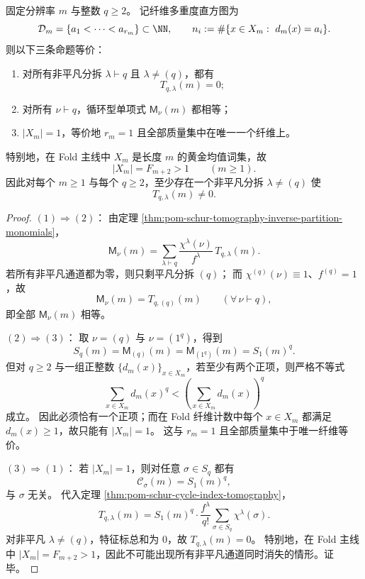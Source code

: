 \begin{theorem}\label{thm:pom-nontrivial-schur-vanishing-iff-single-fiber}
固定分辨率 \(m\) 与整数 \(q\ge 2\)。
记纤维多重度直方图为
\[
\mathcal D_m=\{a_1<\cdots<a_{r_m}\}\subset\NN,
\qquad
n_i:=\#\{x\in X_m:\ d_m(x)=a_i\}.
\]
则以下三条命题等价：
\begin{enumerate}
  \item 对所有非平凡分拆 \(\lambda\vdash q\) 且 \(\lambda\neq(q)\)，都有
  \[
  T_{q,\lambda}(m)=0;
  \]
  \item 对所有 \(\nu\vdash q\)，循环型单项式 \(\mathsf{M}_\nu(m)\) 都相等；
  \item \(|X_m|=1\)，等价地 \(r_m=1\) 且全部质量集中在唯一一个纤维上。
\end{enumerate}
特别地，在 Fold 主线中 \(X_m\) 是长度 \(m\) 的黄金均值词集，故
\[
|X_m|=F_{m+2}>1\qquad(m\ge 1).
\]
因此对每个 \(m\ge 1\) 与每个 \(q\ge 2\)，至少存在一个非平凡分拆 \(\lambda\neq(q)\) 使
\[
T_{q,\lambda}(m)\neq 0.
\]
\end{theorem}
\begin{proof}
\((1)\Rightarrow(2)\)：
由定理 \ref{thm:pom-schur-tomography-inverse-partition-monomials}，
\[
\mathsf{M}_\nu(m)=\sum_{\lambda\vdash q}\frac{\chi^\lambda(\nu)}{f^\lambda}\,T_{q,\lambda}(m).
\]
若所有非平凡通道都为零，则只剩平凡分拆 \((q)\)；
而 \(\chi^{(q)}(\nu)\equiv 1\)、\(f^{(q)}=1\)，故
\[
\mathsf{M}_\nu(m)=T_{q,(q)}(m)\qquad(\forall\,\nu\vdash q),
\]
即全部 \(\mathsf{M}_\nu(m)\) 相等。

\((2)\Rightarrow(3)\)：
取 \(\nu=(q)\) 与 \(\nu=(1^q)\)，得到
\[
S_q(m)=\mathsf{M}_{(q)}(m)=\mathsf{M}_{(1^q)}(m)=S_1(m)^q.
\]
但对 \(q\ge 2\) 与一组正整数 \(\{d_m(x)\}_{x\in X_m}\)，若至少有两个正项，则严格不等式
\[
\sum_{x\in X_m}d_m(x)^q<\left(\sum_{x\in X_m}d_m(x)\right)^q
\]
成立。
因此必须恰有一个正项；而在 Fold 纤维计数中每个 \(x\in X_m\) 都满足 \(d_m(x)\ge 1\)，故只能有 \(|X_m|=1\)。
这与 \(r_m=1\) 且全部质量集中于唯一纤维等价。

\((3)\Rightarrow(1)\)：
若 \(|X_m|=1\)，则对任意 \(\sigma\in S_q\) 都有
\[
\mathcal C_\sigma(m)=S_1(m)^q,
\]
与 \(\sigma\) 无关。
代入定理 \ref{thm:pom-schur-cycle-index-tomography}，
\[
T_{q,\lambda}(m)
=
S_1(m)^q\cdot \frac{f^\lambda}{q!}\sum_{\sigma\in S_q}\chi^\lambda(\sigma).
\]
对非平凡 \(\lambda\neq(q)\)，特征标总和为 \(0\)，故 \(T_{q,\lambda}(m)=0\)。
特别地，在 Fold 主线中 \(|X_m|=F_{m+2}>1\)，因此不可能出现所有非平凡通道同时消失的情形。证毕。
\end{proof}
